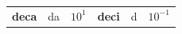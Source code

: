 {\begin{tabular}[t]{|l|l|l|l|l|l|}
                \textbf{deca}
               &
    
    
        da &
    
    
        
                \begin{math}{10}^{1}\end{math}
               &
    
    
        
                \textbf{deci}
               &
    
    
        d &
    
    
        
                \begin{math}{10}^{-1}\end{math}
     \tabularnewline\cline{1-1}\cline{2-2}\cline{3-3}\cline{4-4}\cline{5-5}\cline{6-6}
    \end{tabular}} %
      \addtocounter{footnote}{-0}
      
    
